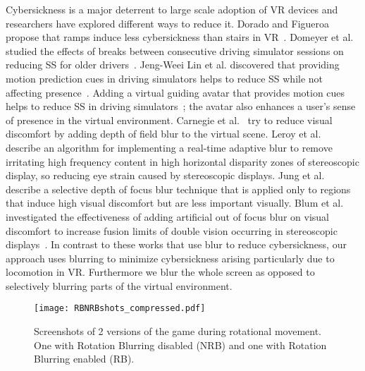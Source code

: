 \documentclass{vgtc}                          %
\begin{document}
Cybersickness is a major deterrent to large scale adoption of VR devices and researchers have explored different ways to reduce it. Dorado and Figueroa propose that ramps induce less cybersickness than stairs in VR~\cite{Dorado2014}. Domeyer et al. studied the effects of breaks between consecutive driving simulator sessions on reducing SS for older drivers~\cite{domeyer2013use}. Jeng-Weei Lin et al. discovered that providing motion prediction cues in driving simulators helps to reduce SS while not affecting presence~\cite{jeng2005unobtrusive}. Adding a virtual guiding avatar that provides motion cues helps to reduce SS in driving simulators~\cite{lin2004virtual}; the avatar also enhances a user's sense of presence in the virtual environment. Carnegie et al.~\cite{carnegie2015reducing} try to reduce visual discomfort by adding depth of field blur to the virtual scene. Leroy et al.~\cite{leroy2012real} describe an algorithm for implementing a real-time adaptive blur to remove irritating high frequency content in high horizontal disparity zones of stereoscopic display, so reducing eye strain caused by stereoscopic displays. Jung et al.~\cite{jung2013visual} describe a selective depth of focus blur technique that is applied only to regions that induce high visual discomfort but are less important visually. Blum et al. investigated the effectiveness of adding artificial out of focus blur on visual discomfort to increase fusion limits of double vision occurring in stereoscopic displays~\cite{Blum2010}.  In contrast to these works that use blur to reduce cybersickness, our approach uses blurring to minimize cybersickness arising particularly due to locomotion in VR. Furthermore we blur the whole screen as opposed to selectively blurring parts of the virtual environment.

\begin{figure*}[tbh]
\vspace{-8pt}
	\centering
	\texttt{[image: RBNRBshots\_compressed.pdf]}
	\caption{ Screenshots of 2 versions of the game during rotational movement. One with Rotation Blurring disabled (NRB) and one with Rotation Blurring enabled (RB).}
	\label{fig:comparison}
	\vspace{-15pt}
\end{figure*}
\end{document}
